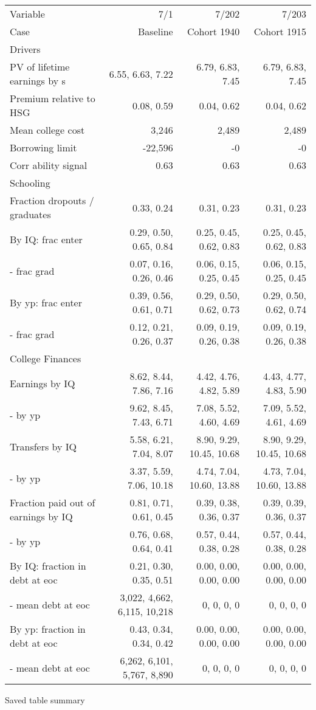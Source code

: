 \begin{tabular}{lrrr}
\hline
Variable & 7/1  & 7/202  & 7/203  \\ 
Case & Baseline  & Cohort 1940  & Cohort 1915  \\ 
Drivers &   &   &   \\ 
PV of lifetime earnings by s & 6.55, 6.63, 7.22  & 6.79, 6.83, 7.45  & 6.79, 6.83, 7.45  \\ 
Premium relative to HSG & 0.08, 0.59  & 0.04, 0.62  & 0.04, 0.62  \\ 
Mean college cost & 3,246  & 2,489  & 2,489  \\ 
Borrowing limit & -22,596  & -0  & -0  \\ 
Corr ability signal & 0.63  & 0.63  & 0.63  \\ 
\hline
Schooling &   &   &   \\ 
Fraction dropouts / graduates & 0.33, 0.24  & 0.31, 0.23  & 0.31, 0.23  \\ 
By IQ: frac enter & 0.29, 0.50, 0.65, 0.84  & 0.25, 0.45, 0.62, 0.83  & 0.25, 0.45, 0.62, 0.83  \\ 
- frac grad & 0.07, 0.16, 0.26, 0.46  & 0.06, 0.15, 0.25, 0.45  & 0.06, 0.15, 0.25, 0.45  \\ 
By yp: frac enter & 0.39, 0.56, 0.61, 0.71  & 0.29, 0.50, 0.62, 0.73  & 0.29, 0.50, 0.62, 0.74  \\ 
- frac grad & 0.12, 0.21, 0.26, 0.37  & 0.09, 0.19, 0.26, 0.38  & 0.09, 0.19, 0.26, 0.38  \\ 
\hline
College Finances &   &   &   \\ 
Earnings by IQ & 8.62, 8.44, 7.86, 7.16  & 4.42, 4.76, 4.82, 5.89  & 4.43, 4.77, 4.83, 5.90  \\ 
- by yp & 9.62, 8.45, 7.43, 6.71  & 7.08, 5.52, 4.60, 4.69  & 7.09, 5.52, 4.61, 4.69  \\ 
Transfers by IQ & 5.58, 6.21, 7.04, 8.07  & 8.90, 9.29, 10.45, 10.68  & 8.90, 9.29, 10.45, 10.68  \\ 
- by yp & 3.37, 5.59, 7.06, 10.18  & 4.74, 7.04, 10.60, 13.88  & 4.73, 7.04, 10.60, 13.88  \\ 
Fraction paid out of earnings by IQ & 0.81, 0.71, 0.61, 0.45  & 0.39, 0.38, 0.36, 0.37  & 0.39, 0.39, 0.36, 0.37  \\ 
- by yp & 0.76, 0.68, 0.64, 0.41  & 0.57, 0.44, 0.38, 0.28  & 0.57, 0.44, 0.38, 0.28  \\ 
By IQ: fraction in debt at eoc & 0.21, 0.30, 0.35, 0.51  & 0.00, 0.00, 0.00, 0.00  & 0.00, 0.00, 0.00, 0.00  \\ 
- mean debt at eoc & 3,022, 4,662, 6,115, 10,218  & 0, 0, 0, 0  & 0, 0, 0, 0  \\ 
By yp: fraction in debt at eoc & 0.43, 0.34, 0.34, 0.42  & 0.00, 0.00, 0.00, 0.00  & 0.00, 0.00, 0.00, 0.00  \\ 
- mean debt at eoc & 6,262, 6,101, 5,767, 8,890  & 0, 0, 0, 0  & 0, 0, 0, 0  \\ 
\hline
\end{tabular}%
Saved table summary

